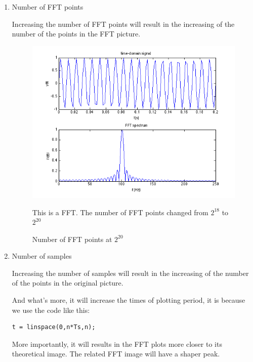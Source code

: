 \documentclass[11pt]{article}
\begin{document}
\begin{enumerate}
\item{Number of FFT points}

Increasing the number of FFT points will result in the increasing of the number of the points in the FFT picture.

\FloatBarrier
\begin{figure}[h!]
\includegraphics[scale=0.75]{fft_samples_2_20.png}
\caption{Number of FFT points at $2^{20}$}

\label{img:FFT_points}
\begin{minipage}{0.75\textwidth}
{\footnotesize This is a FFT. The number of FFT points changed from $2^{18}$ to $2^{20}$}
\end{minipage}
\end{figure}
\FloatBarrier


\item{Number of samples}

Increasing the number of samples will result in the increasing of the number of the points in the original picture.

And what's more, it will increase the times of plotting period, it is because we use the code like this:
\begin{verbatim}
t = linspace(0,n*Ts,n);
\end{verbatim}

More importantly, it will results in the FFT plots more closer to its theoretical image. The related FFT image will have a shaper peak. 


\end{enumerate}
\end{document}
